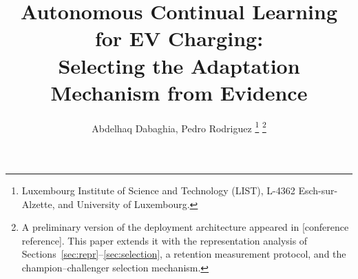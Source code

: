 \documentclass[journal]{IEEEtran}
\begin{document}

\title{Autonomous Continual Learning for EV Charging:\\
Selecting the Adaptation Mechanism from Evidence}

\author{Abdelhaq Dabaghia, Pedro Rodriguez%
\thanks{Luxembourg Institute of Science and Technology (LIST), L-4362
Esch-sur-Alzette, and University of Luxembourg.}%
\thanks{A preliminary version of the deployment architecture appeared in
[conference reference]. This paper extends it with the representation analysis
of Sections~\ref{sec:repr}--\ref{sec:selection}, a retention measurement
protocol, and the champion--challenger selection mechanism.}}

\maketitle
\end{document}
